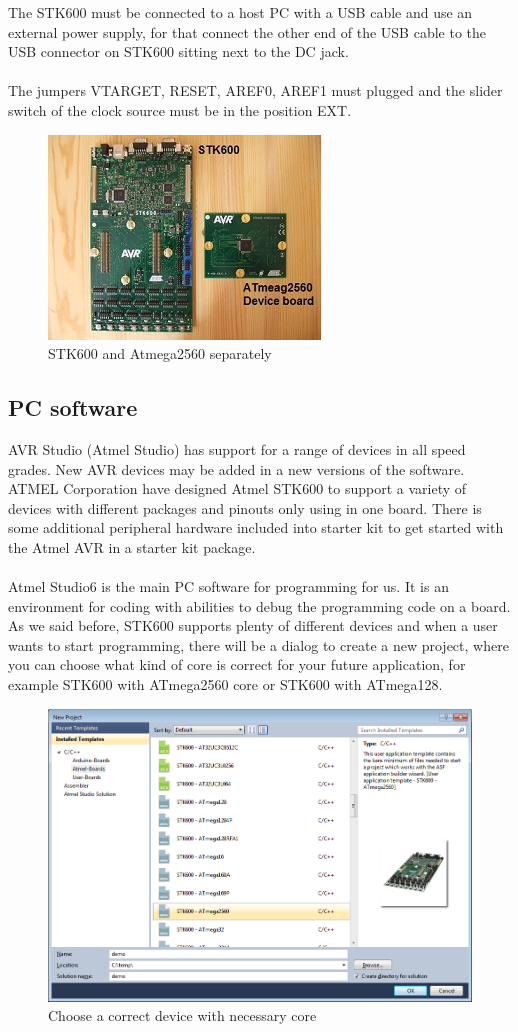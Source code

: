 \documentclass[english]{article}
\begin{document}
The STK600 must be connected to a host PC with a USB cable and use an external power supply, for that connect the other end of the USB cable to the USB connector on STK600 sitting next to the DC jack. \\\\
The jumpers VTARGET, RESET, AREF0, AREF1 must plugged and the slider switch of the clock source must be in the position EXT.
\begin{figure}[H]
\centerline{\includegraphics[scale=0.8]{MicroLab2/image002}}
\caption{STK600 and Atmega2560 separately}
\end{figure}
\subsection{PC software}
AVR Studio (Atmel Studio) has support for a range of devices in all speed grades. New AVR devices may be added in a new versions of the software. ATMEL Corporation have designed Atmel STK600 to support a variety of devices with different packages and pinouts only using in one board. There is some additional peripheral hardware included into starter kit to get started with the Atmel AVR in a starter kit package.\\\\
Atmel Studio6 is the main PC software for programming for us. It is an environment for coding with abilities to debug the programming code on a board. As we said before, STK600 supports plenty of different devices and when a user wants to start programming, there will be a dialog to create a new project, where you can choose what kind of core is correct for your future application, for example STK600 with ATmega2560 core or STK600 with ATmega128.
\begin{figure}[H]
\centerline{\includegraphics[scale=0.3]{MicroLab2/image021}}
\caption{Choose a correct device with necessary core}
\end{figure}
\end{document}
